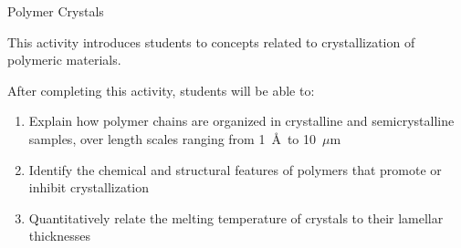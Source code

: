 %
%
%
%

\renewcommand{\figpath}{content/polymphys/thermal-transitions/crystals/figs}
\renewcommand{\labelbase}{crystals}

\begin{activity}{Polymer Crystals}

\begin{instructornotes}
	This activity introduces students to concepts related to crystallization of polymeric materials.
	
	After completing this activity, students will be able to:
	\begin{enumerate}
		\item Explain how polymer chains are organized in crystalline and semicrystalline samples, over length scales ranging from 1~\AA\ to 10~$\mu$m
		\item Identify the chemical and structural features of polymers that promote or inhibit crystallization
		\item Quantitatively relate the melting temperature of crystals to their lamellar thicknesses
	\end{enumerate}
	

\end{instructornotes}
\end{activity}
